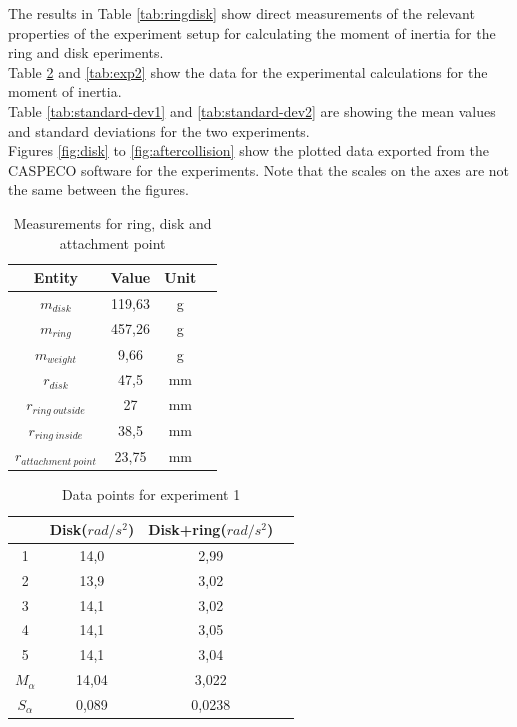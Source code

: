 \documentclass[11pt]{article}
\begin{document}

The results in Table \ref{tab:ringdisk} show direct measurements of the relevant properties of the experiment setup for calculating
the moment of inertia for the ring and disk eperiments.\\  
Table \ref{tab:exp1} and \ref{tab:exp2} show the data for the experimental calculations for the moment of inertia. \\
Table \ref{tab:standard-dev1} and \ref{tab:standard-dev2} are showing the mean values and standard deviations for the two experiments.\\ 
Figures \ref{fig:disk} to \ref{fig:aftercollision} show the plotted data exported from the CASPECO software for the experiments. 
Note that the scales on the axes are not the same between the figures.


\begin{table}[H]
\centering
\caption{Measurements for ring, disk and attachment point}
\label{tab:ringdisk}
\begin{tabular}{c c c c}
\hline
Entity & Value  & Unit \\
\hline
$m_{disk}$ & 119,63 & g &\\
$m_{ring}$ & 457,26 & g &\\
$m_{weight}$ & 9,66 & g &\\
$r_{disk}$ & 47,5 & mm &\\
$r_{ring\: outside}$ & 27 & mm &\\
$r_{ring\: inside}$ & 38,5 & mm &\\
$r_{attachment\: point}$ & 23,75& mm& \\
\hline
\end{tabular}

\label{tab:värden}
\end{table}

\begin{table}[H]
\centering
\caption{Data points for experiment 1}
\begin{tabular}{c c c c}
\hline
 & Disk($rad/s^2$)  & Disk+ring($rad/s^2$) \\
\hline
1 & 14,0 & 2,99 &\\
2 & 13,9 & 3,02 &\\
3 & 14,1 & 3,02 &\\
4 & 14,1 & 3,05 &\\
5 & 14,1 & 3,04 &\\
$M_\alpha$& 14,04 & 3,022 &\\
$S_\alpha$ & 0,089& 0,0238& \\
\hline
\end{tabular}

\label{tab:exp1}
\end{table}
\end{document}
